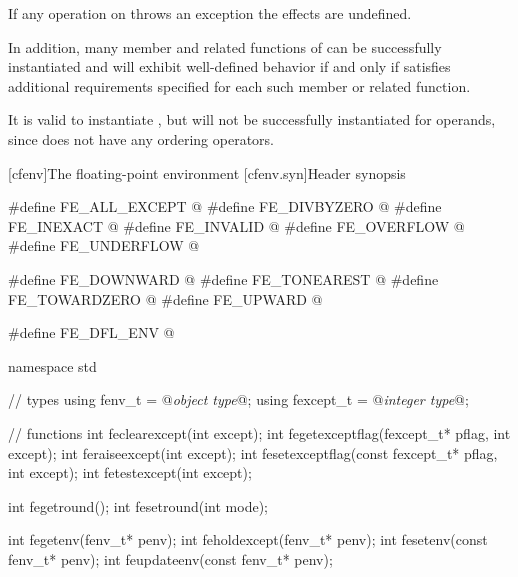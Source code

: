 \pnum
If any operation on 
throws an exception the effects are undefined.

\pnum
In addition, many member and related functions of
can be successfully instantiated
and will exhibit well-defined behavior if and only if
 satisfies additional requirements specified for each such member
or related function.

\pnum
\begin{example}
It is valid to instantiate
,
but
will not be successfully instantiated for
operands, since
does not have any ordering operators.
\end{example}

[cfenv]{The floating-point environment}
[cfenv.syn]{Header  synopsis}
%
%

%
%
%
%
%
%
%
%
%
%
%
%
%
%
%
%
%
%
%
%
%
%
%
%
\begin{codeblock}
#define FE_ALL_EXCEPT @\seebelow@
#define FE_DIVBYZERO @\seebelow@
#define FE_INEXACT @\seebelow@
#define FE_INVALID @\seebelow@
#define FE_OVERFLOW @\seebelow@
#define FE_UNDERFLOW @\seebelow@

#define FE_DOWNWARD @\seebelow@
#define FE_TONEAREST @\seebelow@
#define FE_TOWARDZERO @\seebelow@
#define FE_UPWARD @\seebelow@

#define FE_DFL_ENV @\seebelow@

namespace std {
  // types
  using fenv_t    = @\textit{object type}@;
  using fexcept_t = @\textit{integer type}@;

  // functions
  int feclearexcept(int except);
  int fegetexceptflag(fexcept_t* pflag, int except);
  int feraiseexcept(int except);
  int fesetexceptflag(const fexcept_t* pflag, int except);
  int fetestexcept(int except);

  int fegetround();
  int fesetround(int mode);

  int fegetenv(fenv_t* penv);
  int feholdexcept(fenv_t* penv);
  int fesetenv(const fenv_t* penv);
  int feupdateenv(const fenv_t* penv);
}
\end{codeblock}

